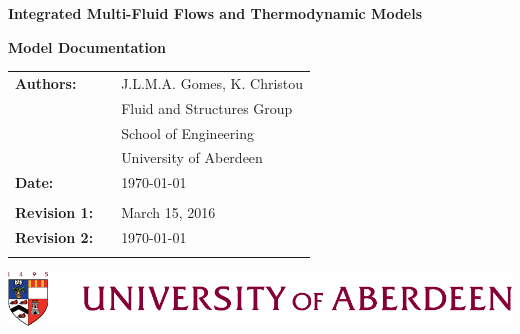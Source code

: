 \documentclass[11pts,a4paper,amsmath,amssymb,floatfix]{book}
\theoremstyle{definition}
\theoremstyle{plain}
\theoremstyle{definition}
\theoremstyle{remark}
\begin{document}
\vspace{4cm}

\begin{titlepage}
  \begin{center}
\vspace{3.5cm}

       {\bf{\Huge Integrated Multi-Fluid Flows and Thermodynamic Models}}

\bigskip
       {\bf{\huge Model Documentation}}

\vspace{3.5cm}

  \end{center}

  \begin{tabular}{l c l}
     {\bf{\large Authors:}}                         &     & J.L.M.A. Gomes, K. Christou \\
                                                    &     & Fluid and Structures Group \\
                                                    &     & School of Engineering \\
                                                    &     & University of Aberdeen \\
\bigskip
     {\bf{\large Date:}}                            &     &   \today                    \\
                                                    &     &                             \\
     {\bf{\large Revision 1:}}                      &     &  March 15, 2016             \\
     {\bf{\large Revision 2:}}                      &     &  \today                     \\
                                                    &     &                             \\
  \end{tabular}
\vspace{3.5cm}

\bigskip

\bigskip


   \includegraphics[width=15cm,clip]{./FigBanner/UoAHorizBanner}



\end{titlepage}
\end{document}
